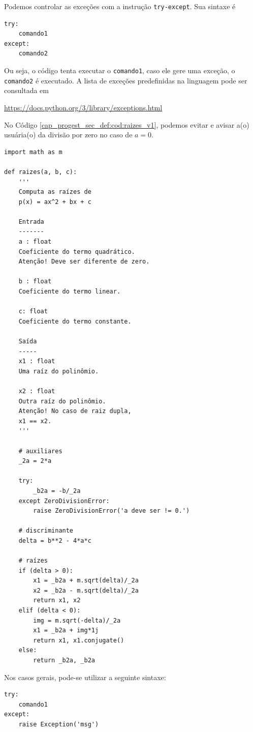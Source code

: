 Podemos controlar as exceções com a instrução \lstinline+try-except+. Sua sintaxe é

\begin{lstlisting}
try:
    comando1
except:
    comando2
\end{lstlisting}

Ou seja, o código tenta executar o \lstinline+comando1+, caso ele gere uma exceção, o \lstinline+comando2+ é executado. A lista de exceções predefinidas na linguagem pode ser consultada em
\begin{center}
  \url{https://docs.python.org/3/library/exceptions.html}
\end{center}

\begin{ex}
  No Código \ref{cap_progest_sec_def:cod:raizes_v1}, podemos evitar e avisar a(o) usuária(o) da divisão por zero no caso de $a=0$.

\begin{lstlisting}[caption=raizes\_v2.py]
import math as m

def raizes(a, b, c):
    '''
    Computa as raízes de
    p(x) = ax^2 + bx + c

    Entrada
    -------
    a : float
    Coeficiente do termo quadrático.
    Atenção! Deve ser diferente de zero.

    b : float 
    Coeficiente do termo linear.

    c: float
    Coeficiente do termo constante.

    Saída
    -----
    x1 : float
    Uma raíz do polinômio.

    x2 : float
    Outra raíz do polinômio.
    Atenção! No caso de raiz dupla,
    x1 == x2.
    '''

    # auxiliares
    _2a = 2*a

    try:
        _b2a = -b/_2a
    except ZeroDivisionError:
        raise ZeroDivisionError('a deve ser != 0.')

    # discriminante
    delta = b**2 - 4*a*c

    # raízes
    if (delta > 0):
        x1 = _b2a + m.sqrt(delta)/_2a
        x2 = _b2a - m.sqrt(delta)/_2a
        return x1, x2
    elif (delta < 0):
        img = m.sqrt(-delta)/_2a
        x1 = _b2a + img*1j
        return x1, x1.conjugate()
    else:
        return _b2a, _b2a
\end{lstlisting}

\end{ex}

\begin{obs}
  Nos casos gerais, pode-se utilizar a seguinte sintaxe:

\begin{lstlisting}
try:
    comando1
except:
    raise Exception('msg')
\end{lstlisting}

\end{obs}

